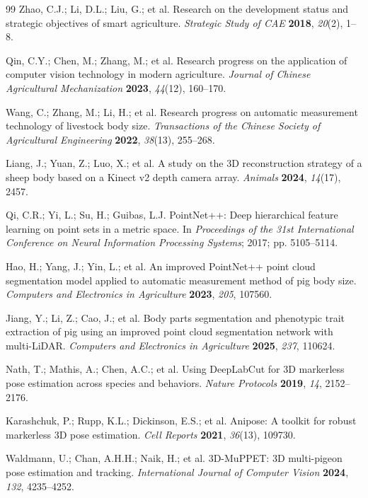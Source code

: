 \documentclass[computers,article,submit,pdftex,moreauthors]{Definitions/mdpi}
\begin{document}
\begin{thebibliography}{99}
 Zhao, C.J.; Li, D.L.; Liu, G.; et al. Research on the development status and strategic objectives of smart agriculture. \textit{Strategic Study of CAE} \textbf{2018}, \textit{20}(2), 1--8.

 Qin, C.Y.; Chen, M.; Zhang, M.; et al. Research progress on the application of computer vision technology in modern agriculture. \textit{Journal of Chinese Agricultural Mechanization} \textbf{2023}, \textit{44}(12), 160--170.

 Wang, C.; Zhang, M.; Li, H.; et al. Research progress on automatic measurement technology of livestock body size. \textit{Transactions of the Chinese Society of Agricultural Engineering} \textbf{2022}, \textit{38}(13), 255--268.

 Liang, J.; Yuan, Z.; Luo, X.; et al. A study on the 3D reconstruction strategy of a sheep body based on a Kinect v2 depth camera array. \textit{Animals} \textbf{2024}, \textit{14}(17), 2457.

 Qi, C.R.; Yi, L.; Su, H.; Guibas, L.J. PointNet++: Deep hierarchical feature learning on point sets in a metric space. In \textit{Proceedings of the 31st International Conference on Neural Information Processing Systems}; 2017; pp. 5105--5114.

 Hao, H.; Yang, J.; Yin, L.; et al. An improved PointNet++ point cloud segmentation model applied to automatic measurement method of pig body size. \textit{Computers and Electronics in Agriculture} \textbf{2023}, \textit{205}, 107560.

 Jiang, Y.; Li, Z.; Cao, J.; et al. Body parts segmentation and phenotypic trait extraction of pig using an improved point cloud segmentation network with multi-LiDAR. \textit{Computers and Electronics in Agriculture} \textbf{2025}, \textit{237}, 110624.

 Nath, T.; Mathis, A.; Chen, A.C.; et al. Using DeepLabCut for 3D markerless pose estimation across species and behaviors. \textit{Nature Protocols} \textbf{2019}, \textit{14}, 2152--2176.

 Karashchuk, P.; Rupp, K.L.; Dickinson, E.S.; et al. Anipose: A toolkit for robust markerless 3D pose estimation. \textit{Cell Reports} \textbf{2021}, \textit{36}(13), 109730.

 Waldmann, U.; Chan, A.H.H.; Naik, H.; et al. 3D-MuPPET: 3D multi-pigeon pose estimation and tracking. \textit{International Journal of Computer Vision} \textbf{2024}, \textit{132}, 4235--4252.


\end{thebibliography}
\end{document}
